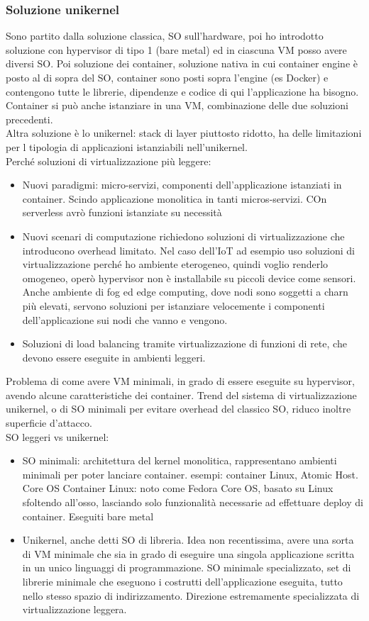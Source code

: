 \documentclass{article}
\begin{document}
\subsubsection{Soluzione unikernel}
Sono partito dalla soluzione classica, SO sull'hardware, poi ho introdotto soluzione con hypervisor di tipo 1 (bare metal) ed in ciascuna VM posso avere diversi SO. Poi soluzione dei container, soluzione nativa in cui container engine è posto al di sopra del SO, container sono posti sopra l'engine (es Docker) e contengono tutte le librerie, dipendenze e codice di qui l'applicazione ha bisogno. Container si può anche istanziare in una VM, combinazione delle due soluzioni precedenti.\\ Altra soluzione è lo unikernel: stack di layer piuttosto ridotto, ha delle limitazioni per l tipologia di applicazioni istanziabili nell'unikernel.\\ Perché soluzioni di virtualizzazione più leggere:
\begin{itemize}
\item Nuovi paradigmi:  micro-servizi, componenti dell'applicazione istanziati in container. Scindo applicazione monolitica in tanti micros-servizi. COn serverless avrò funzioni istanziate su necessità
\item Nuovi scenari di computazione richiedono soluzioni di virtualizzazione che introducono overhead limitato. Nel caso dell'IoT ad esempio uso soluzioni di virtualizzazione perché ho ambiente eterogeneo, quindi voglio renderlo omogeneo, operò hypervisor non è installabile su piccoli device come sensori. Anche ambiente di fog ed edge computing, dove nodi sono soggetti a charn più elevati, servono soluzioni per istanziare velocemente i componenti dell'applicazione sui nodi che vanno e vengono.
\item Soluzioni di load balancing tramite virtualizzazione di funzioni di rete, che devono essere eseguite in ambienti leggeri.
\end{itemize}
Problema di come avere VM minimali, in grado di essere eseguite su hypervisor, avendo alcune caratteristiche dei container. Trend del sistema di virtualizzazione unikernel, o di SO minimali per evitare overhead del classico SO, riduco inoltre superficie d'attacco.\\ SO leggeri vs unikernel:
\begin{itemize}
\item SO minimali: architettura del kernel monolitica, rappresentano ambienti minimali per poter lanciare container. esempi: container Linux, Atomic Host. Core OS Container Linux: noto come Fedora Core OS, basato su Linux sfoltendo all'osso, lasciando solo funzionalità necessarie ad effettuare deploy di container. Eseguiti bare metal
\item Unikernel, anche detti SO di libreria. Idea non recentissima, avere una sorta di VM minimale che sia in grado di eseguire una singola applicazione scritta in un unico linguaggi di programmazione. SO minimale specializzato, set di librerie minimale che eseguono i costrutti dell'applicazione eseguita, tutto nello stesso spazio di indirizzamento. Direzione estremamente specializzata di virtualizzazione leggera.
\end{itemize}
\end{document}
